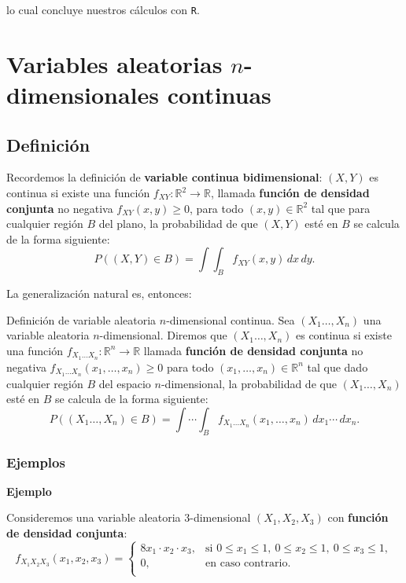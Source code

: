 \documentclass[
  letterpaper,
  DIV=11,
  numbers=noendperiod]{scrreprt}
\begin{document}
lo cual concluye nuestros cálculos con \texttt{R}.

\hypertarget{variables-aleatorias-n-dimensionales-continuas}{%
\section{\texorpdfstring{Variables aleatorias \(n\)-dimensionales
continuas}{Variables aleatorias n-dimensionales continuas}}\label{variables-aleatorias-n-dimensionales-continuas}}

\hypertarget{definiciuxf3n-5}{%
\subsection{Definición}\label{definiciuxf3n-5}}

Recordemos la definición de \textbf{variable continua bidimensional}:
\((X,Y)\) es continua si existe una función
\(f_{XY}:\mathbb{R}^2\longrightarrow \mathbb{R}\), llamada
\textbf{función de densidad conjunta} no negativa \(f_{XY}(x,y)\geq 0\),
para todo \((x,y)\in\mathbb{R}^2\) tal que para cualquier región \(B\)
del plano, la probabilidad de que \((X,Y)\) esté en \(B\) se calcula de
la forma siguiente: \[
P((X,Y)\in B)=\int\int_B f_{XY}(x,y)\,dx\, dy.
\]

La generalización natural es, entonces:

Definición de variable aleatoria \(n\)-dimensional continua. Sea
\((X_1\ldots,X_n)\) una variable aleatoria \(n\)-dimensional. Diremos
que \((X_1\ldots,X_n)\) es continua si existe una función
\(f_{X_1\ldots X_n}:\mathbb{R}^n\longrightarrow \mathbb{R}\) llamada
\textbf{función de densidad conjunta} no negativa
\(f_{X_1\ldots X_n}(x_1,\ldots,x_n)\geq 0\) para todo
\((x_1,\ldots,x_n)\in\mathbb{R}^n\) tal que dado cualquier región \(B\)
del espacio \(n\)-dimensional, la probabilidad de que
\((X_1\ldots,X_n)\) esté en \(B\) se calcula de la forma siguiente: \[
P((X_1\ldots,X_n)\in B)=\int\cdots\int_B f_{X_1\ldots X_n}(x_1,\ldots,x_n)\,dx_1\cdots\,dx_n.
\]

\hypertarget{ejemplos-9}{%
\subsubsection{Ejemplos}\label{ejemplos-9}}

\textbf{Ejemplo}

Consideremos una variable aleatoria \(3\)-dimensional \((X_1,X_2,X_3)\)
con \textbf{función de densidad conjunta}: \[
f_{X_1X_2X_3}(x_1,x_2,x_3)=\begin{cases}
8 x_1\cdot x_2\cdot x_3, & \mbox{si }0\leq x_1\leq 1,\ 0\leq x_2\leq 1,\ 0\leq x_3\leq 1, \\
0, & \mbox{en caso contrario.}\\
\end{cases}
\]
\end{document}
